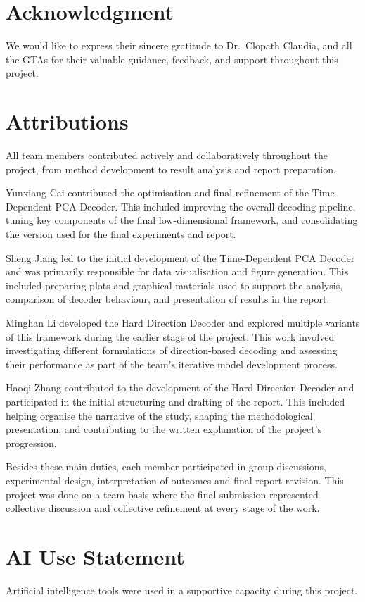 \documentclass[conference]{IEEEtran}
\begin{document}
\section*{Acknowledgment}
We would like to express their sincere gratitude to Dr.\ Clopath Claudia, and all the GTAs for their valuable guidance, feedback, and support throughout this project.

\section*{Attributions}

All team members contributed actively and collaboratively throughout the project, from method development to result analysis and report preparation.

Yunxiang Cai contributed the optimisation and final refinement of the Time-Dependent PCA Decoder. This included improving the overall decoding pipeline, tuning key components of the final low-dimensional framework, and consolidating the version used for the final experiments and report. 

Sheng Jiang led to the initial development of the Time-Dependent PCA Decoder and was primarily responsible for data visualisation and figure generation. This included preparing plots and graphical materials used to support the analysis, comparison of decoder behaviour, and presentation of results in the report. 

Minghan Li developed the Hard Direction Decoder and explored multiple variants of this framework during the earlier stage of the project. This work involved investigating different formulations of direction-based decoding and assessing their performance as part of the team’s iterative model development process. 

Haoqi Zhang contributed to the development of the Hard Direction Decoder and participated in the initial structuring and drafting of the report. This included helping organise the narrative of the study, shaping the methodological presentation, and contributing to the written explanation of the project’s progression.

Besides these main duties, each member participated in group discussions, experimental design, interpretation of outcomes and final report revision. This project was done on a team basis where the final submission represented collective discussion and collective refinement at every stage of the work.

\section*{AI Use Statement}
Artificial intelligence tools were used in a supportive capacity during this project.
\end{document}
